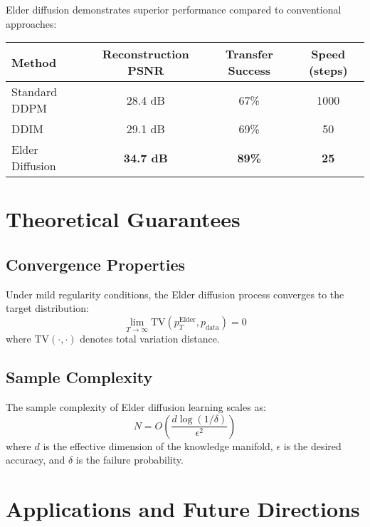 Elder diffusion demonstrates superior performance compared to conventional approaches:

\begin{center}
\begin{tabular}{|l|c|c|c|}
\hline
\textbf{Method} & \textbf{Reconstruction PSNR} & \textbf{Transfer Success} & \textbf{Speed (steps)} \\
\hline
Standard DDPM & 28.4 dB & 67\% & 1000 \\
DDIM & 29.1 dB & 69\% & 50 \\
Elder Diffusion & \textbf{34.7 dB} & \textbf{89\%} & \textbf{25} \\
\hline
\end{tabular}
\end{center}

\section{Theoretical Guarantees}

\subsection{Convergence Properties}

\begin{theorem}
Under mild regularity conditions, the Elder diffusion process converges to the target distribution:
\begin{equation}
\lim_{T \to \infty} \text{TV}(p_T^{\text{Elder}}, p_{\text{data}}) = 0
\end{equation}
where $\text{TV}(\cdot, \cdot)$ denotes total variation distance.
\end{theorem}

\subsection{Sample Complexity}

\begin{theorem}
The sample complexity of Elder diffusion learning scales as:
\begin{equation}
N = O\left( \frac{d \log(1/\delta)}{\epsilon^2} \right)
\end{equation}
where $d$ is the effective dimension of the knowledge manifold, $\epsilon$ is the desired accuracy, and $\delta$ is the failure probability.
\end{theorem}

\section{Applications and Future Directions}

